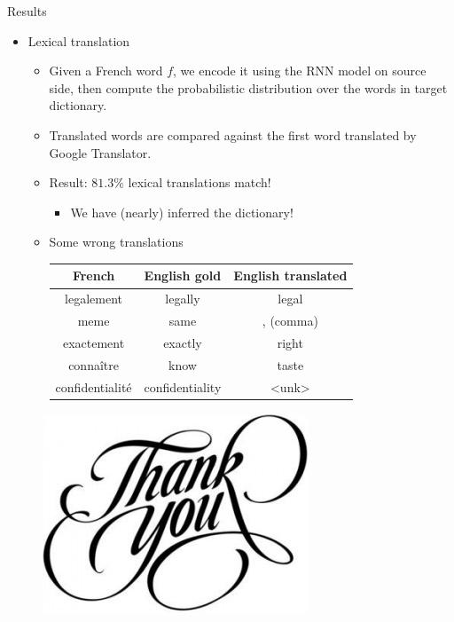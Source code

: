 \documentclass[pdf]{beamer}
\begin{document}
\begin{frame}{Results}
\begin{itemize}
\item Lexical translation
\begin{itemize}
\item Given a French word $f$, we encode it using the RNN model on source side, then compute the probabilistic distribution over the words in target dictionary.
\item Translated words are compared against the first word translated by Google Translator.
\item Result: $81.3 \%$ lexical translations match!
\begin{itemize}
\item We have (nearly) inferred the dictionary!
\end{itemize}
\item Some wrong translations
\begin{table}
\begin{center}
\begin{tabular}{| c | c | c |}
\hline
French & English gold & English translated \\
\hline \hline
legalement & legally & legal \\
meme & same & , (comma) \\
exactement & exactly & right \\
connaître & know & taste \\
confidentialité & confidentiality & <unk> \\
\hline
\end{tabular}
\end{center}
\end{table}
\end{itemize}
\end{itemize}
\end{frame}

\begin{frame}
\begin{figure}
\begin{center}
\includegraphics[scale=0.9]{thankyou.jpg}
\end{center}
\end{figure}
\end{frame}
\end{document}
